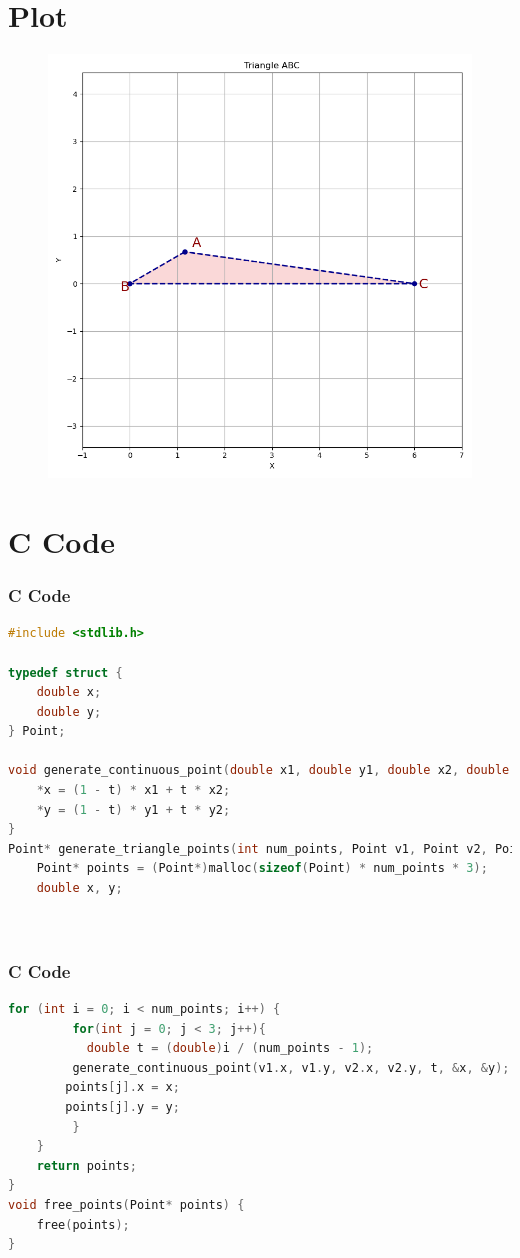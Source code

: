\documentclass{beamer}
\theoremstyle{remark}
\numberwithin{equation}{section}
\begin{document}
\section{Plot}
\begin{frame}
\begin{figure}[!ht]
    \centering
    \includegraphics[width=\linewidth]{figs/fig.png}
\end{figure}
\end{frame}

\section{C Code}
\begin{frame}[fragile]
\frametitle{C Code}
\begin{lstlisting}[language=C]
#include <stdlib.h>

typedef struct {
    double x;
    double y;
} Point;

void generate_continuous_point(double x1, double y1, double x2, double y2, double t, double *x, double *y) {
    *x = (1 - t) * x1 + t * x2; 
    *y = (1 - t) * y1 + t * y2;
}
Point* generate_triangle_points(int num_points, Point v1, Point v2, Point v3) {
    Point* points = (Point*)malloc(sizeof(Point) * num_points * 3);
    double x, y;
    
   
    \end{lstlisting}
\end{frame}
\begin{frame}[fragile]
\frametitle{C Code}
\begin{lstlisting}[language=C]
   for (int i = 0; i < num_points; i++) {
         for(int j = 0; j < 3; j++){
           double t = (double)i / (num_points - 1); 
         generate_continuous_point(v1.x, v1.y, v2.x, v2.y, t, &x, &y);
        points[j].x = x;
        points[j].y = y;
         }
    }
    return points;
}
void free_points(Point* points) {
    free(points);
}
\end{lstlisting}
\end{frame}
\end{document}
